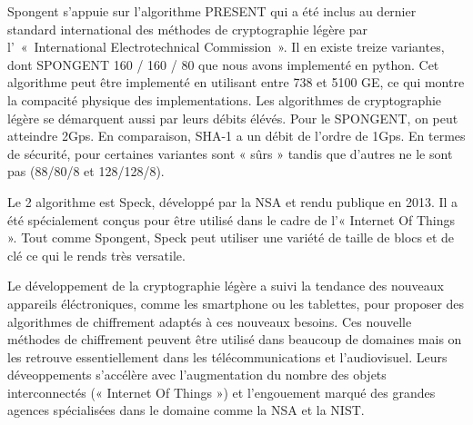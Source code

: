 Spongent s'appuie sur l'algorithme PRESENT qui a été inclus au dernier standard international des méthodes de cryptographie légère par l' « International Electrotechnical Commission ».
Il en existe treize variantes, dont SPONGENT 160 / 160 / 80 que nous avons implementé en python.
Cet algorithme peut être implementé en utilisant entre 738 et 5100 GE, ce qui montre la compacité physique des implementations.
Les algorithmes de cryptographie légère se démarquent aussi par leurs débits élévés. Pour le SPONGENT, on peut atteindre 2Gps.
En comparaison, SHA-1 a un débit de l'ordre de 1Gps.
En termes de sécurité, pour certaines variantes sont « sûrs » tandis que d'autres ne le sont pas (88/80/8 et 128/128/8).

Le 2 algorithme est Speck, développé par la NSA et rendu publique en 2013. Il a été spécialement conçus pour être utilisé dans le cadre de l'« Internet Of Things ».
Tout comme Spongent, Speck peut utiliser une variété de taille de blocs et de clé ce qui le rends très versatile.

Le développement de la cryptographie légère a suivi la tendance des nouveaux appareils éléctroniques, comme les smartphone ou les tablettes, pour proposer des algorithmes de chiffrement adaptés à ces nouveaux besoins.
Ces nouvelle méthodes de chiffrement peuvent être utilisé dans beaucoup de domaines mais on les retrouve essentiellement dans les télécommunications et l'audiovisuel.
Leurs déveoppements s'accélère avec l'augmentation du nombre des objets interconnectés (« Internet Of Things ») et l'engouement marqué des grandes agences spécialisées dans le domaine comme la NSA et la NIST.
